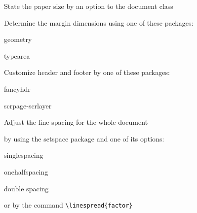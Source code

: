 \documentclass{article}
\begin{document}
\begin{compactenum}
  \item State the paper size by an option to
        the document class
  \item Determine the margin dimensions using one
        of these packages:
  \begin{compactitem}
    \item geometry
    \item typearea
  \end{compactitem}
  \item Customize header and footer by one
        of these packages:
  \begin{compactitem}
    \item fancyhdr
    \item scrpage-scrlayer
  \end{compactitem}
  \item Adjust the line spacing for the whole document
  \begin{compactitem}
    \item by using the setspace package and one
          of its options:
      \begin{inparaenum}
        \item singlespacing
        \item onehalfspacing
        \item double spacing
      \end{inparaenum} 
    \item or by the command \verb|\linespread{factor}|
  \end{compactitem}
\end{compactenum}
\end{document}
